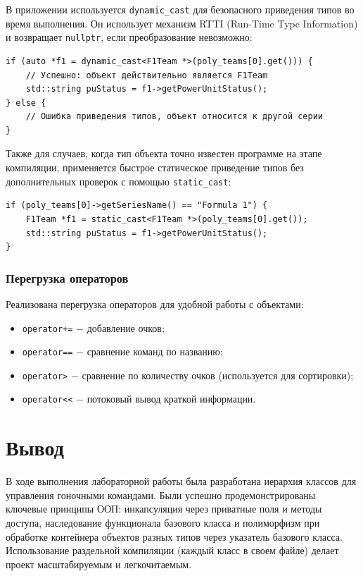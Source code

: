 \documentclass[oneside,a4paper,14pt]{extarticle}
\begin{document}
В приложении используется \texttt{dynamic\_cast} для безопасного приведения типов во время выполнения. Он использует механизм RTTI (Run-Time Type Information) и возвращает \texttt{nullptr}, если преобразование невозможно:

\begin{verbatim}
if (auto *f1 = dynamic_cast<F1Team *>(poly_teams[0].get())) {
    // Успешно: объект действительно является F1Team
    std::string puStatus = f1->getPowerUnitStatus();
} else {
    // Ошибка приведения типов, объект относится к другой серии
}
\end{verbatim}

Также для случаев, когда тип объекта точно известен программе на этапе компиляции, применяется быстрое статическое приведение типов без дополнительных проверок с помощью \texttt{static\_cast}:

\begin{verbatim}
if (poly_teams[0]->getSeriesName() == "Formula 1") {
    F1Team *f1 = static_cast<F1Team *>(poly_teams[0].get());
    std::string puStatus = f1->getPowerUnitStatus();
}
\end{verbatim}


\subsubsection*{Перегрузка операторов}
Реализована перегрузка операторов для удобной работы с объектами:
\begin{itemize}
  \item \texttt{operator+=} $-$ добавление очков;
  \item \texttt{operator==} $-$ сравнение команд по названию;
  \item \texttt{operator\textgreater} $-$ сравнение по количеству очков (используется для сортировки);
  \item \texttt{operator\textless\textless} $-$ потоковый вывод краткой информации.
\end{itemize}

\section*{Вывод}
В ходе выполнения лабораторной работы была разработана иерархия классов для управления гоночными командами. Были успешно продемонстрированы ключевые принципы ООП: инкапсуляция через приватные поля и методы доступа, наследование функционала базового класса и полиморфизм при обработке контейнера объектов разных типов через указатель базового класса. Использование раздельной компиляции (каждый класс в своем файле) делает проект масштабируемым и легкочитаемым.
\end{document}
